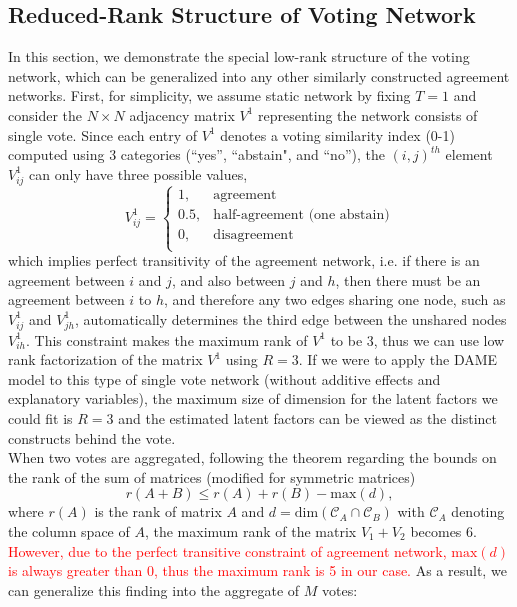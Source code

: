 \documentclass[a4paper]{article}
\begin{document}
\subsection{Reduced-Rank Structure of Voting Network}\label{subsec: reduced rank}
In this section, we demonstrate the special low-rank structure of the voting network, which can be generalized into any other similarly constructed agreement networks. First, for simplicity, we assume static network by fixing $T = 1$ and consider the $N \times N$ adjacency matrix $V^1$ representing the network consists of single vote. Since each entry of $V^1$ denotes a voting similarity index (0-1) computed using 3 categories (“yes”, ``abstain", and “no”), the $(i, j)^{th}$ element $V^1_{ij}$ can only have three possible values,
\begin{equation*}
V^1_{ij} =\begin{cases}
1, & \mbox{agreement}\\
0.5, &\mbox{half-agreement (one abstain)}\\
0, & \mbox{disagreement}\\
\end{cases}
\end{equation*}
which implies perfect transitivity of the agreement network, i.e. if there is an agreement between $i$ and $j$, and also between $j$ and $h$, then there must be an agreement between $i$ to $h$, and therefore any two edges sharing one node, such as $V^1_{ij}$ and $V^1_{jh}$, automatically determines the third edge between the unshared nodes $V^1_{ih}$. This constraint makes the maximum rank of $V^1$ to be 3, thus we can use low rank factorization of the matrix $V^1$ using $R=3$. If we were to apply the DAME model to this type of single vote network (without additive effects and explanatory variables), the maximum size of dimension for the latent factors we could fit is $R=3$ and the estimated latent factors can be viewed as the distinct constructs behind the vote. \\ \newline
\iffalse When two votes are aggregated, following the theorem regarding the bounds on the rank of the sum of matrices (modified for symmetric matrices) \citep{marsaglia1967bounds}
\begin{equation*}
 r(A + B) \leq r(A) + r(B) - \mbox{max}(d), 
\end{equation*}
where $r(A)$ is the rank of matrix $A$ and $d = \mbox{dim}(\mathcal{C}_A \cap \mathcal{C}_B)$ with $\mathcal{C}_A$ denoting the column space of $A$, the maximum rank of the matrix $V_1+V_2$ becomes 6. \textcolor{red}{However, due to the perfect transitive constraint of agreement network, $\mbox{max}(d)$ is always greater than 0, thus the maximum rank is 5 in our case.} As a result, we can generalize this finding into the aggregate of $M$ votes:
\end{document}
